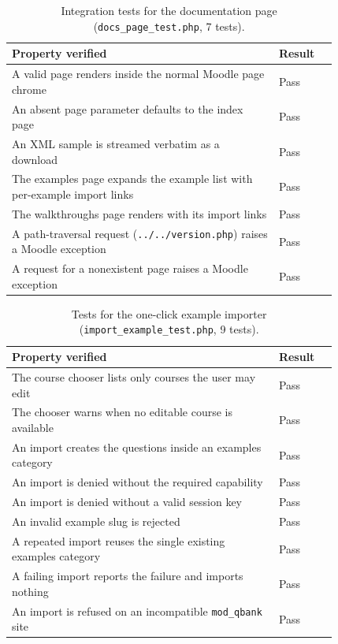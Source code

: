\begin{table}[h]
\centering
\small
\begin{tabular}{@{}p{0.82\linewidth} l@{}}
\toprule
\textbf{Property verified} & \textbf{Result} \\
\midrule
A valid page renders inside the normal Moodle page chrome & Pass \\
An absent page parameter defaults to the index page & Pass \\
An XML sample is streamed verbatim as a download & Pass \\
The examples page expands the example list with per-example import links & Pass \\
The walkthroughs page renders with its import links & Pass \\
A path-traversal request (\texttt{../../version.php}) raises a Moodle exception & Pass \\
A request for a nonexistent page raises a Moodle exception & Pass \\
\bottomrule
\end{tabular}
\caption{Integration tests for the documentation page (\texttt{docs\_page\_test.php}, 7 tests).}
\label{tab:tests-docspage}
\end{table}

\begin{table}[h]
\centering
\small
\begin{tabular}{@{}p{0.82\linewidth} l@{}}
\toprule
\textbf{Property verified} & \textbf{Result} \\
\midrule
The course chooser lists only courses the user may edit & Pass \\
The chooser warns when no editable course is available & Pass \\
An import creates the questions inside an examples category & Pass \\
An import is denied without the required capability & Pass \\
An import is denied without a valid session key & Pass \\
An invalid example slug is rejected & Pass \\
A repeated import reuses the single existing examples category & Pass \\
A failing import reports the failure and imports nothing & Pass \\
An import is refused on an incompatible \texttt{mod\_qbank} site & Pass \\
\bottomrule
\end{tabular}
\caption{Tests for the one-click example importer (\texttt{import\_example\_test.php}, 9 tests).}
\label{tab:tests-import}
\end{table}

